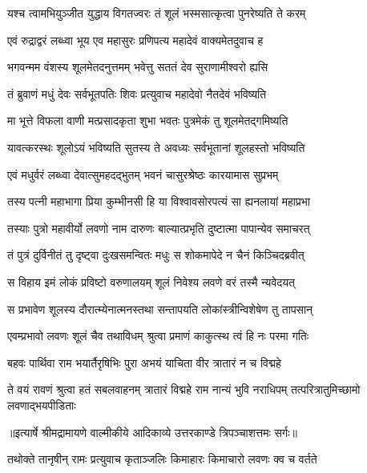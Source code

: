 \twolineshloka
{यश्च त्वामभियुञ्जीत युद्धाय विगतज्वरः}
{तं शूलं भस्मसात्कृत्वा पुनरेष्यति ते करम्} %

\twolineshloka
{एवं रुद्राद्वरं लब्ध्वा भूय एव महासुरः}
{प्रणिपत्य महादेवं वाक्यमेतदुवाच ह} %

\twolineshloka
{भगवन्मम वंशस्य शूलमेतदनुत्तमम्}
{भवेत्तु सततं देव सुराणामीश्वरो ह्यसि} %

\twolineshloka
{तं ब्रुवाणं मधुं देवः सर्वभूतपतिः शिवः}
{प्रत्युवाच महादेवो नैतदेवं भविष्यति} %

\twolineshloka
{मा भूत्ते विफला वाणी मत्प्रसादकृता शुभा}
{भवतः पुत्रमेकं तु शूलमेतद्गमिष्यति} %

\twolineshloka
{यावत्करस्थः शूलोऽयं भविष्यति सुतस्य ते}
{अवध्यः सर्वभूतानां शूलहस्तो भविष्यति} %

\twolineshloka
{एवं मधुर्वरं लब्ध्वा देवात्सुमहदद्भुतम्}
{भवनं चासुरश्रेष्ठः कारयामास सुप्रभम्} %

\twolineshloka
{तस्य पत्नी महाभागा प्रिया कुम्भीनसी हि या}
{विश्वावसोरपत्यं सा ह्यनलायां महाप्रभा} %

\twolineshloka
{तस्याः पुत्रो महावीर्यो लवणो नाम दारुणः}
{बाल्यात्प्रभृति दुष्टात्मा पापान्येव समाचरत्} %

\twolineshloka
{तं पुत्रं दुर्विनीतं तु दृष्ट्वा दुःखसमन्वितः}
{मधुः स शोकमापेदे न चैनं किञ्चिदब्रवीत्} %

\twolineshloka
{स विहाय इमं लोकं प्रविष्टो वरुणालयम्}
{शूलं निवेश्य लवणे वरं तस्मै न्यवेदयत्} %

\twolineshloka
{स प्रभावेण शूलस्य दौरात्म्येनात्मनस्तथा}
{सन्तापयति लोकांस्त्रीन्विशेषेण तु तापसान्} %

\twolineshloka
{एवम्प्रभावो लवणः शूलं चैव तथाविधम्}
{श्रुत्वा प्रमाणं काकुत्स्थ त्वं हि नः परमा गतिः} %

\twolineshloka
{बहवः पार्थिवा राम भयार्तैरृषिभिः पुरा}
{अभयं याचिता वीर त्रातारं न च विद्महे} %

\threelineshloka
{ते वयं रावणं श्रुत्वा हतं सबलवाहनम्}
{त्रातारं विद्महे राम नान्यं भुवि नराधिपम्}
{तत्परित्रातुमिच्छामो लवणाद्भयपीडिताः} %


{॥इत्यार्षे श्रीमद्रामायणे वाल्मीकीये आदिकाव्ये उत्तरकाण्डे त्रिपञ्चाशत्तमः सर्गः॥}


\twolineshloka
{तथोक्ते तानृषीन् रामः प्रत्युवाच कृताञ्जलिः}
{किमाहारः किमाचारो लवणः क्व च वर्तते} %

